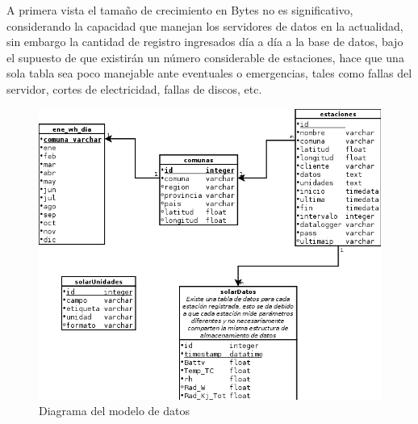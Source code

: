 A primera vista el tamaño de crecimiento en Bytes no es significativo, considerando la capacidad que manejan los servidores de datos en la actualidad, sin embargo la cantidad de registro ingresados día a día a la base de datos, bajo el supuesto de que existirán un número considerable de estaciones, hace que una sola tabla sea poco manejable ante eventuales o emergencias, tales como fallas del servidor, cortes de electricidad, fallas de discos, etc.

\begin{figure}[h!]
        \centering
        \includegraphics[scale=0.6]{images/modeloDatos}
        \caption{Diagrama del modelo de datos}
        \label{modeloDatos}
\end{figure}


